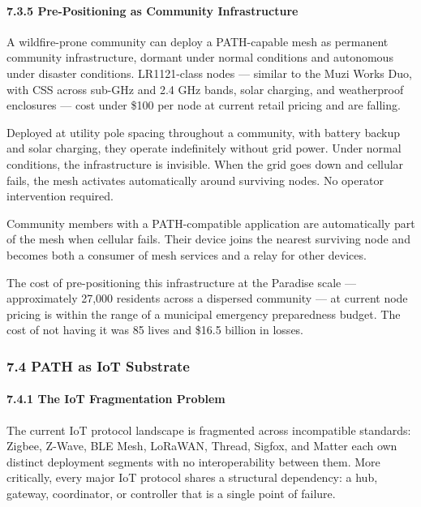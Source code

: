\documentclass[
  11pt,
]{article}
\begin{document}
\hypertarget{pre-positioning-as-community-infrastructure}{%
\paragraph{7.3.5 Pre-Positioning as Community
Infrastructure}\label{pre-positioning-as-community-infrastructure}}

A wildfire-prone community can deploy a PATH-capable mesh as permanent
community infrastructure, dormant under normal conditions and autonomous
under disaster conditions. LR1121-class nodes --- similar to the Muzi
Works Duo, with CSS across sub-GHz and 2.4 GHz bands, solar charging,
and weatherproof enclosures --- cost under \$100 per node at current
retail pricing and are falling.

Deployed at utility pole spacing throughout a community, with battery
backup and solar charging, they operate indefinitely without grid power.
Under normal conditions, the infrastructure is invisible. When the grid
goes down and cellular fails, the mesh activates automatically around
surviving nodes. No operator intervention required.

Community members with a PATH-compatible application are automatically
part of the mesh when cellular fails. Their device joins the nearest
surviving node and becomes both a consumer of mesh services and a relay
for other devices.

The cost of pre-positioning this infrastructure at the Paradise scale
--- approximately 27,000 residents across a dispersed community --- at
current node pricing is within the range of a municipal emergency
preparedness budget. The cost of not having it was 85 lives and \$16.5
billion in losses.

\hypertarget{path-as-iot-substrate}{%
\subsubsection{7.4 PATH as IoT Substrate}\label{path-as-iot-substrate}}

\hypertarget{the-iot-fragmentation-problem}{%
\paragraph{7.4.1 The IoT Fragmentation
Problem}\label{the-iot-fragmentation-problem}}

The current IoT protocol landscape is fragmented across incompatible
standards: Zigbee, Z-Wave, BLE Mesh, LoRaWAN, Thread, Sigfox, and Matter
each own distinct deployment segments with no interoperability between
them. More critically, every major IoT protocol shares a structural
dependency: a hub, gateway, coordinator, or controller that is a single
point of failure.
\end{document}
